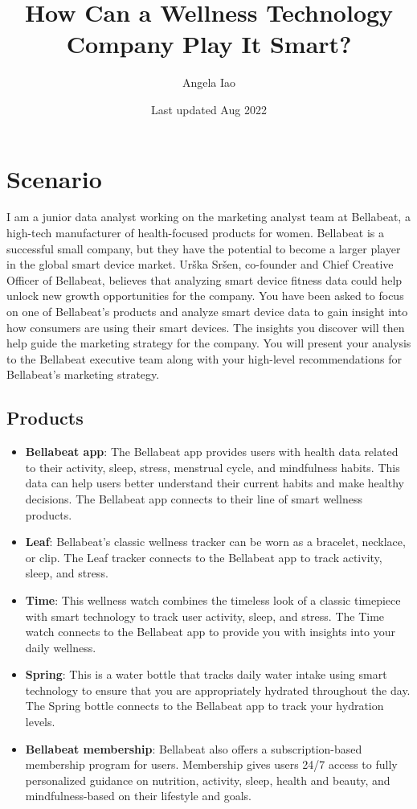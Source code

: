 \documentclass[
]{article}
\title{How Can a Wellness Technology Company Play It Smart?}
\author{Angela Iao}
\date{Last updated Aug 2022}
\providecommand{\tightlist}{%
  \setlength{\itemsep}{0pt}\setlength{\parskip}{0pt}}
\begin{document}
\maketitle

\hypertarget{scenario}{%
\section{Scenario}\label{scenario}}

I am a junior data analyst working on the marketing analyst team at
Bellabeat, a high-tech manufacturer of health-focused products for
women. Bellabeat is a successful small company, but they have the
potential to become a larger player in the global smart device market.
Urška Sršen, co-founder and Chief Creative Officer of Bellabeat,
believes that analyzing smart device fitness data could help unlock new
growth opportunities for the company. You have been asked to focus on
one of Bellabeat's products and analyze smart device data to gain
insight into how consumers are using their smart devices. The insights
you discover will then help guide the marketing strategy for the
company. You will present your analysis to the Bellabeat executive team
along with your high-level recommendations for Bellabeat's marketing
strategy.

\hypertarget{products}{%
\subsection{Products}\label{products}}

\begin{itemize}
\tightlist
\item
  \textbf{Bellabeat app}: The Bellabeat app provides users with health
  data related to their activity, sleep, stress, menstrual cycle, and
  mindfulness habits. This data can help users better understand their
  current habits and make healthy decisions. The Bellabeat app connects
  to their line of smart wellness products.
\item
  \textbf{Leaf}: Bellabeat's classic wellness tracker can be worn as a
  bracelet, necklace, or clip. The Leaf tracker connects to the
  Bellabeat app to track activity, sleep, and stress.
\item
  \textbf{Time}: This wellness watch combines the timeless look of a
  classic timepiece with smart technology to track user activity, sleep,
  and stress. The Time watch connects to the Bellabeat app to provide
  you with insights into your daily wellness.
\item
  \textbf{Spring}: This is a water bottle that tracks daily water intake
  using smart technology to ensure that you are appropriately hydrated
  throughout the day. The Spring bottle connects to the Bellabeat app to
  track your hydration levels.
\item
  \textbf{Bellabeat membership}: Bellabeat also offers a
  subscription-based membership program for users. Membership gives
  users 24/7 access to fully personalized guidance on nutrition,
  activity, sleep, health and beauty, and mindfulness-based on their
  lifestyle and goals.
\end{itemize}
\end{document}
